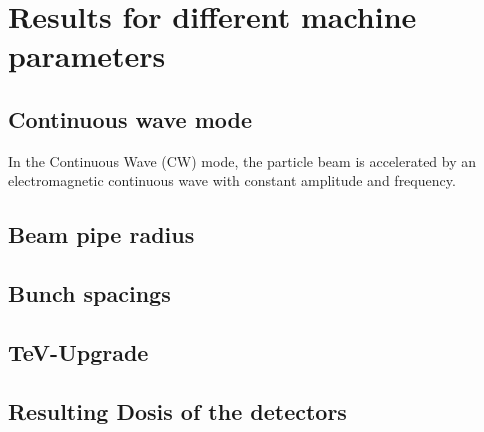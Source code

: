 \section{Results for different machine parameters}
\label{EffectDetectors:MachineParameters}
\subsection{Continuous wave mode}
\label{EffectDetectors:MachineParameters:CW}
In the Continuous Wave (CW) mode, the particle beam is accelerated by an electromagnetic continuous wave with constant amplitude and frequency.
\subsection{Beam pipe radius}
\label{EffectDetectors:MachineParameters:beampipe}
\subsection{Bunch spacings}
\label{EffectDetectors:MachineParameters:bunchspacing}
\subsection{TeV-Upgrade}
\label{EffectDetectors:MachineParameters:upgrade}
\subsection{Resulting Dosis of the detectors}
\label{EffectDetectors:MachineParameters:dosis}

